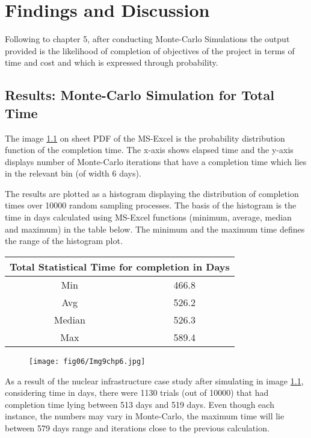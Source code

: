 \let\textcircled=\pgftextcircled
\chapter{Findings and Discussion}
\label{chapFD}

Following to chapter 5, after conducting Monte-Carlo Simulations the output provided is the likelihood of completion of objectives of the project in terms of time and cost and which is expressed through probability.

\section{Results: Monte-Carlo Simulation for Total Time} 
\label{section6.1}

The image \ref{img9ch6} on sheet PDF of the MS-Excel is the probability distribution function of the completion time. The x-axis shows elapsed time and the y-axis displays number of Monte-Carlo iterations that have a completion time which lies in the relevant bin (of width 6 days).

The results are plotted as a histogram displaying the distribution of completion times over 10000 random sampling processes. 
The basis of the histogram is the time in days calculated using MS-Excel functions (minimum, average, median and maximum) in the table below. The minimum and the maximum time defines the range of the histogram plot.

\begin{center}
	\begin{tabular}{ |c|c|} 
		\hline
		\multicolumn{2}{|c|}{Total Statistical Time for completion in Days} \\
		\hline
		Min & 466.8  \\
		\hline
		Avg& 526.2 \\ 
		\hline
		Median &526.3 \\ 
		\hline
		Max& 589.4\\ 
		\hline
	\end{tabular}
\end{center}

\begin{figure}
	\centering
	\texttt{[image: fig06/Img9chp6.jpg]}
	\label{img9ch6}
\end{figure}

 As a result of the nuclear infrastructure case study after simulating in image \ref{img9ch6}, considering time in days, there were 1130 trials (out of 10000) that had completion time lying between 513 days and 519 days. Even though each instance, the numbers may vary in Monte-Carlo, the maximum time will lie between 579 days range and iterations close to the previous calculation.
 

